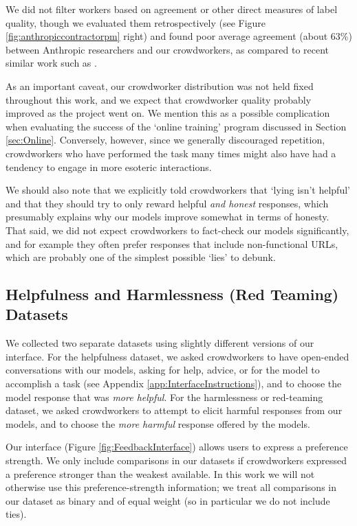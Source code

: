 We did not  filter workers based on agreement or other direct measures of label quality, though we evaluated them retrospectively (see Figure \ref{fig:anthropiccontractorpm} right) and found  poor average agreement (about 63\%) between Anthropic researchers and our crowdworkers, as compared to recent similar work such as \cite{stiennon2020learning, InstructGPT}. 

As an important caveat, our crowdworker distribution was not held fixed throughout this work, and we expect that crowdworker quality probably improved as the project went on.  We mention this as  a possible complication when evaluating the success of the `online training' program discussed in Section \ref{sec:Online}.  Conversely, however, since we generally discouraged repetition, crowdworkers who have performed the task many times might also have had a tendency to engage in more esoteric interactions. 

We should also note that we explicitly told crowdworkers that `lying isn't helpful' and that they should try to only reward helpful \emph{and honest} responses, which presumably explains why our models improve somewhat in terms of honesty.  That said, we did not expect crowdworkers to fact-check our models significantly, and for example they  often prefer responses that include non-functional URLs, which are probably one of the simplest possible `lies' to debunk.

\subsection{Helpfulness and Harmlessness (Red Teaming) Datasets}

We collected two separate datasets using slightly different versions of our interface.  For the helpfulness dataset, we asked crowdworkers to have open-ended conversations with our models, asking for help, advice, or for the model to accomplish a task (see Appendix \ref{app:InterfaceInstructions}), and to choose the model response that was \emph{more helpful}.  For the harmlessness or red-teaming dataset, we asked crowdworkers to attempt to elicit harmful responses from our models, and to choose the \emph{more harmful} response offered by the models. 

Our interface (Figure \ref{fig:FeedbackInterface}) allows users to express a preference strength.  We only include comparisons in our datasets if crowdworkers expressed a preference stronger than the weakest available.  In this work we will not otherwise use this preference-strength information; we treat all comparisons in our dataset as binary and of equal weight (so in particular we do not include ties).

